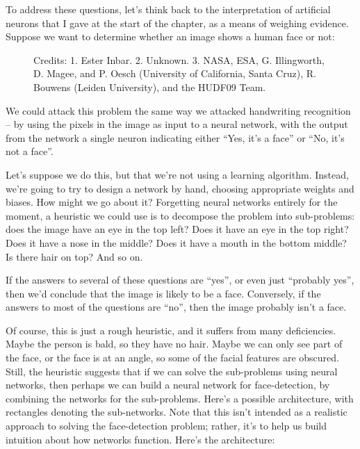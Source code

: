 \documentclass[a4paper,twoside,10pt]{book}
\begin{document}
To address these questions, let's think back to the interpretation of artificial neurons that I gave at the start of the chapter, as a means of weighing evidence. Suppose we want to determine whether an image shows a human face or not:

\begin{figure}
	\caption{Credits: 1. Ester Inbar. 2. Unknown. 3. NASA, ESA, G. Illingworth, D. Magee, and P. Oesch (University of California, Santa Cruz), R. Bouwens (Leiden University), and the HUDF09 Team.}
\end{figure}
We could attack this problem the same way we attacked handwriting recognition -- by using the pixels in the image as input to a neural network, with the output from the network a single neuron indicating either ``Yes, it's a face'' or ``No, it's not a face''.

Let's suppose we do this, but that we're not using a learning algorithm. Instead, we're going to try to design a network by hand, choosing appropriate weights and biases. How might we go about it? Forgetting neural networks entirely for the moment, a heuristic we could use is to decompose the problem into sub-problems: does the image have an eye in the top left? Does it have an eye in the top right? Does it have a nose in the middle? Does it have a mouth in the bottom middle? Is there hair on top? And so on.

If the answers to several of these questions are ``yes'', or even just ``probably yes'', then we'd conclude that the image is likely to be a face. Conversely, if the answers to most of the questions are ``no'', then the image probably isn't a face.

Of course, this is just a rough heuristic, and it suffers from many deficiencies. Maybe the person is bald, so they have no hair. Maybe we can only see part of the face, or the face is at an angle, so some of the facial features are obscured. Still, the heuristic suggests that if we can solve the sub-problems using neural networks, then perhaps we can build a neural network for face-detection, by combining the networks for the sub-problems. Here's a possible architecture, with rectangles denoting the sub-networks. Note that this isn't intended as a realistic approach to solving the face-detection problem; rather, it's to help us build intuition about how networks function. Here's the architecture:
\end{document}
